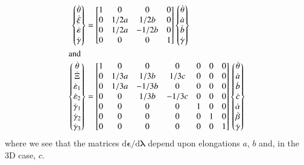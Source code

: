 \begin{subequations}
    \label{strainGradient}
    \begin{align}
    \left\{ \begin{matrix}
    \dot{\theta} \\ \dot{\xi} \\ \dot{\varepsilon} \\ \dot{\gamma}
    \end{matrix} \right\} & = \begin{bmatrix}
    1 & 0 & 0 & 0 \\ 0 & 1/2a & 1/2b & 0 \\ 0 & 1/2a & -1/2b & 0 \\ 0 & 0 & 0 & 1
    \end{bmatrix} \left\{ \begin{matrix}
    \dot{\theta} \\ \dot{a} \\ \dot{b} \\ \dot{\gamma}
    \end{matrix} \right\} \\
    \intertext{and}
    \left\{ \begin{matrix}
    \dot{\theta} \\ \dot{\Xi} \\ \dot{\varepsilon}_1 \\ \dot{\varepsilon}_2 \\ 
    \dot{\gamma}_1 \\ \dot{\gamma}_2 \\ \dot{\gamma}_3
    \end{matrix} \right\} & = \begin{bmatrix}
    1 & 0 & 0 & 0 & 0 & 0 & 0 \\
    0 & 1/3a & 1/3b & 1/3c & 0 & 0 & 0 \\ 
    0 & 1/3a & -1/3b & 0 & 0 & 0 & 0 \\ 
    0 & 0 & 1/3b & -1/3c & 0 & 0 & 0 \\
    0 & 0 & 0 & 0 & 1 & 0 & 0 \\
    0 & 0 & 0 & 0 & 0 & 1 & 0 \\
    0 & 0 & 0 & 0 & 0 & 0 & 1
    \end{bmatrix} \left\{ \begin{matrix}
    \dot{\theta} \\ \dot{a} \\ \dot{b} \\ \dot{c} \\ 
    \dot{\alpha} \\ \dot{\beta} \\ \dot{\gamma}
    \end{matrix} \right\}
    \end{align}
\end{subequations}
where we see that the matrices $\mathrm{d} \boldsymbol{\epsilon} / \mathrm{d} \boldsymbol{\lambda}$ depend upon elongations $a$, $b$ and, in the 3D case, $c$.

